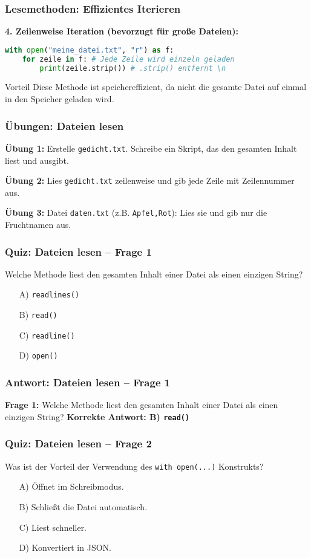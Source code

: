 \documentclass[aspectratio=169]{beamer} %
\begin{document}
\begin{frame}[fragile]
\frametitle{Lesemethoden: Effizientes Iterieren}
\textbf{4. Zeilenweise Iteration (bevorzugt für große Dateien):}
\begin{lstlisting}[language=Python]
with open("meine_datei.txt", "r") as f:
    for zeile in f: # Jede Zeile wird einzeln geladen
        print(zeile.strip()) # .strip() entfernt \n
\end{lstlisting}
\begin{block}{Vorteil}
    Diese Methode ist speichereffizient, da nicht die gesamte Datei auf einmal in den Speicher geladen wird.
\end{block}
\end{frame}

\begin{frame}[fragile]
\frametitle{Übungen: Dateien lesen}
\textbf{Übung 1:}
Erstelle \texttt{gedicht.txt}. Schreibe ein Skript, das den gesamten Inhalt liest und ausgibt.
\vspace{0.5em}

\textbf{Übung 2:}
Lies \texttt{gedicht.txt} zeilenweise und gib jede Zeile mit Zeilennummer aus.
\vspace{0.5em}

\textbf{Übung 3:}
Datei \texttt{daten.txt} (z.B. \texttt{Apfel,Rot}): Lies sie und gib nur die Fruchtnamen aus.
\end{frame}

\begin{frame}[fragile]
\frametitle{Quiz: Dateien lesen – Frage 1}
Welche Methode liest den gesamten Inhalt einer Datei als einen einzigen String?
\begin{enumerate}
    \item[A)] \texttt{readlines()}
    \item[B)] \texttt{read()}
    \item[C)] \texttt{readline()}
    \item[D)] \texttt{open()}
\end{enumerate}
\end{frame}

\begin{frame}[fragile]
\frametitle{Antwort: Dateien lesen – Frage 1}
\textbf{Frage 1:} Welche Methode liest den gesamten Inhalt einer Datei als einen einzigen String?
\vspace{1em}
\textbf{Korrekte Antwort: B) \texttt{read()}}
\end{frame}

\begin{frame}[fragile]
\frametitle{Quiz: Dateien lesen – Frage 2}
Was ist der Vorteil der Verwendung des \texttt{with open(...)} Konstrukts?
\begin{enumerate}
    \item[A)] Öffnet im Schreibmodus.
    \item[B)] Schließt die Datei automatisch.
    \item[C)] Liest schneller.
    \item[D)] Konvertiert in JSON.
\end{enumerate}
\end{frame}
\end{document}
